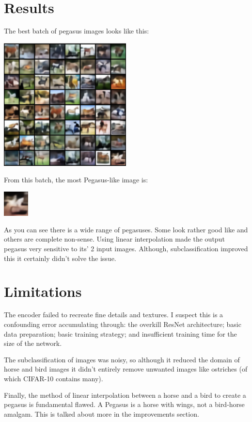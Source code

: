 \documentclass{article}
\begin{document}
\section{Results}
The best batch of pegasus images looks like this:
\begin{center}
    \includegraphics[width=0.5\textwidth]{figures/64_cropped.png}
\end{center}
From this batch, the most Pegasus-like image is:
\begin{center}
    \includegraphics[width=0.1\textwidth]{figures/1_cropped.png}
\end{center}

As you can see there is a wide range of pegasuses. Some look rather good like and others are complete non-sense. Using linear interpolation made the output pegasus very sensitive to its' 2 input images. Although, subclassification improved this it certainly didn't solve the issue.  

\section{Limitations}
The encoder failed to recreate fine details and textures. I suspect this is a confounding error accumulating through: the overkill ResNet architecture; basic data preparation; basic training strategy; and insufficient training time for the size of the network.

The subclassification of images was noisy, so although it reduced the domain of horse and bird images it didn't entirely remove unwanted images like ostriches (of which CIFAR-10 contains many). 

Finally, the method of linear interpolation between a horse and a bird to create a pegasus is fundamental flawed. A Pegasus is a horse with wings, not a bird-horse amalgam. This is talked about more in the improvements section.  
\end{document}
